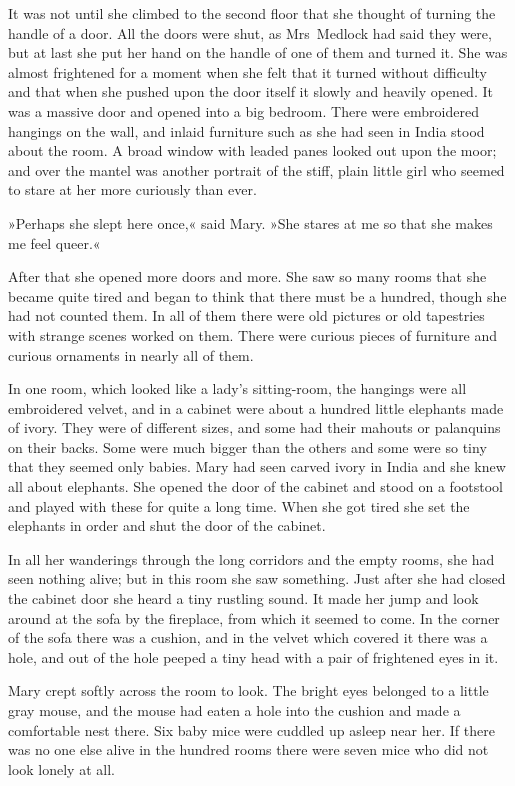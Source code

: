 It was not until she climbed to the second floor that she thought of turning the handle of a door. All the doors were shut, as Mrs~Medlock had said they were, but at last she put her hand on the handle of one of them and turned it. She was almost frightened for a moment when she felt that it turned without difficulty and that when she pushed upon the door itself it slowly and heavily opened. It was a massive door and opened into a big bedroom. There were embroidered hangings on the wall, and inlaid furniture such as she had seen in India stood about the room. A broad window with leaded panes looked out upon the moor; and over the mantel was another portrait of the stiff, plain little girl who seemed to stare at her more curiously than ever.

»Perhaps she slept here once,« said Mary. »She stares at me so that she makes me feel queer.«

After that she opened more doors and more. She saw so many rooms that she became quite tired and began to think that there must be a hundred, though she had not counted them. In all of them there were old pictures or old tapestries with strange scenes worked on them. There were curious pieces of furniture and curious ornaments in nearly all of them.

In one room, which looked like a lady's sitting-room, the hangings were all embroidered velvet, and in a cabinet were about a hundred little elephants made of ivory. They were of different sizes, and some had their mahouts or palanquins on their backs. Some were much bigger than the others and some were so tiny that they seemed only babies. Mary had seen carved ivory in India and she knew all about elephants. She opened the door of the cabinet and stood on a footstool and played with these for quite a long time. When she got tired she set the elephants in order and shut the door of the cabinet.

In all her wanderings through the long corridors and the empty rooms, she had seen nothing alive; but in this room she saw something. Just after she had closed the cabinet door she heard a tiny rustling sound. It made her jump and look around at the sofa by the fireplace, from which it seemed to come. In the corner of the sofa there was a cushion, and in the velvet which covered it there was a hole, and out of the hole peeped a tiny head with a pair of frightened eyes in it.

Mary crept softly across the room to look. The bright eyes belonged to a little gray mouse, and the mouse had eaten a hole into the cushion and made a comfortable nest there. Six baby mice were cuddled up asleep near her. If there was no one else alive in the hundred rooms there were seven mice who did not look lonely at all.


